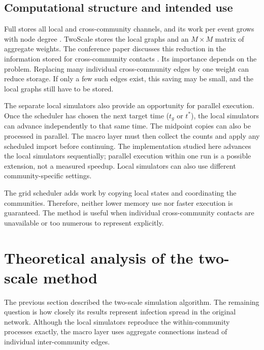 \documentclass{ieeeaccess}
\newcommand{\Full}{\textup{Full}}
\newcommand{\TS}{\textup{TwoScale}}
\begin{document}
\subsection{Computational structure and intended use}
\label{sec:cost}

\Full{} stores all local and cross-community channels, and its work per event grows with node degree \cite{kuryliak2025simulating}. \TS{} stores the local graphs and an $M\times M$ matrix of aggregate weights. The conference paper discusses this reduction in the information stored for cross-community contacts \cite{kuryliak2025towards}. Its importance depends on the problem. Replacing many individual cross-community edges by one weight can reduce storage. If only a few such edges exist, this saving may be small, and the local graphs still have to be stored.

The separate local simulators also provide an opportunity for parallel execution. Once the scheduler has chosen the next target time ($t_g$ or $t^\ast$), the local simulators can advance independently to that same time. The midpoint copies can also be processed in parallel. The macro layer must then collect the counts and apply any scheduled import before continuing. The implementation studied here advances the local simulators sequentially; parallel execution within one run is a possible extension, not a measured speedup. Local simulators can also use different community-specific settings.

The grid scheduler adds work by copying local states and coordinating the communities. Therefore, neither lower memory use nor faster execution is guaranteed. The method is useful when individual cross-community contacts are unavailable or too numerous to represent explicitly.

\section{Theoretical analysis of the two-scale method}
\label{sec:analysis}

The previous section described the two-scale simulation algorithm. The remaining question is how closely its results represent infection spread in the original network. Although the local simulators reproduce the within-community processes exactly, the macro layer uses aggregate connections instead of individual inter-community edges.
\end{document}
